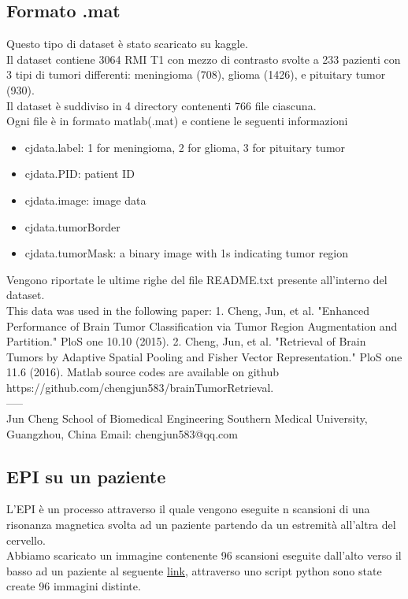 \documentclass{article}
\begin{document}
\subsection{Formato .mat}
Questo tipo di dataset è stato scaricato su kaggle.\\
Il dataset contiene 3064 RMI T1 con mezzo di contrasto svolte a 233 pazienti con 3 tipi di tumori differenti:  meningioma (708), 
glioma (1426), e pituitary tumor (930).\\
Il dataset è suddiviso in 4 directory contenenti 766 file ciascuna.\\
Ogni file è in formato matlab(.mat) e contiene le seguenti informazioni
\begin{itemize}
    \item cjdata.label: 1 for meningioma, 2 for glioma, 3 for pituitary tumor
    \item cjdata.PID: patient ID
    \item cjdata.image: image data
    \item cjdata.tumorBorder
    \item cjdata.tumorMask: a binary image with 1s indicating tumor region
\end{itemize}
Vengono riportate le ultime righe del file README.txt presente all'interno del dataset.\\ 
This data was used in the following paper:
1. Cheng, Jun, et al. "Enhanced Performance of Brain Tumor Classification via Tumor Region Augmentation
and Partition." PloS one 10.10 (2015).
2. Cheng, Jun, et al. "Retrieval of Brain Tumors by Adaptive Spatial Pooling and Fisher Vector 
Representation." PloS one 11.6 (2016). Matlab source codes are available on github\\ 
https://github.com/chengjun583/brainTumorRetrieval.\\

-----\\
Jun Cheng
School of Biomedical Engineering
Southern Medical University, Guangzhou, China
Email: chengjun583@qq.com
\subsection{EPI su un paziente}
L'EPI è un processo attraverso il quale vengono eseguite n scansioni di una risonanza magnetica svolta ad un paziente partendo da un estremità all'altra del cervello.\\
Abbiamo scaricato un immagine contenente 96 scansioni eseguite dall'alto verso il basso ad un paziente al seguente \href{https://www.mdpi.com/materials/materials-04-01941/article_deploy/html/images/materials-04-01941-g004.png}{link}, attraverso uno script python sono state create 96 immagini distinte.
\end{document}
